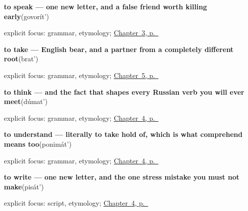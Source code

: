 \noindent\begin{minipage}[t]{\linewidth}
\raggedright
\textbf{to speak — one new letter, and a false friend worth killing early}\enspace\emph{}\enspace(govorít')\par
\footnotesize explicit focus: grammar, etymology; \hyperref[ch:russian-first-verbs]{Chapter~3, p.~\pageref*{ch:russian-first-verbs}}
\end{minipage}\par\smallskip

\noindent\begin{minipage}[t]{\linewidth}
\raggedright
\textbf{to take — English bear, and a partner from a completely different root}\enspace\emph{}\enspace(brat')\par
\footnotesize explicit focus: grammar, etymology; \hyperref[ch:russian-verbs-of-the-hand]{Chapter~5, p.~\pageref*{ch:russian-verbs-of-the-hand}}
\end{minipage}\par\smallskip

\noindent\begin{minipage}[t]{\linewidth}
\raggedright
\textbf{to think — and the fact that shapes every Russian verb you will ever meet}\enspace\emph{}\enspace(dúmat')\par
\footnotesize explicit focus: grammar, etymology; \hyperref[ch:russian-verbs-of-the-mind]{Chapter~4, p.~\pageref*{ch:russian-verbs-of-the-mind}}
\end{minipage}\par\smallskip

\noindent\begin{minipage}[t]{\linewidth}
\raggedright
\textbf{to understand — literally to take hold of, which is what comprehend means too}\enspace\emph{}\enspace(ponimát')\par
\footnotesize explicit focus: grammar, etymology; \hyperref[ch:russian-verbs-of-the-mind]{Chapter~4, p.~\pageref*{ch:russian-verbs-of-the-mind}}
\end{minipage}\par\smallskip

\noindent\begin{minipage}[t]{\linewidth}
\raggedright
\textbf{to write — one new letter, and the one stress mistake you must not make}\enspace\emph{}\enspace(pisát')\par
\footnotesize explicit focus: script, etymology; \hyperref[ch:russian-verbs-of-the-mind]{Chapter~4, p.~\pageref*{ch:russian-verbs-of-the-mind}}
\end{minipage}\par\smallskip

